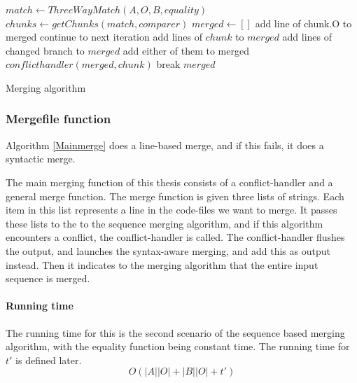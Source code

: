 \documentclass[11pt]{article}
\begin{document}
\begin{algorithm}
\begin{algorithmic}
   \State $match \gets ThreeWayMatch(A, O, B, equality)$
   \State $chunks \gets getChunks(match, comparer)$
   \State $merged \gets []$
            \State add line of chunk.O to merged
            \State continue to next iteration
        \EndIf
            \State add lines of $chunk$ to $merged$
        \Else
               \State add lines of changed branch to $merged$
            \Else
                   \State add either of them to merged
                \Else
                   \State $conflicthandler(merged, chunk)$
                      \State break
                   \EndIf
                \EndIf
			\EndIf
   		\EndIf
    \EndFor
	\State \Return $merged$
\EndFunction


\end{algorithmic}
\caption{Merging algorithm}
  \label{Genericmergingalgorithm}
\end{algorithm}

\subsubsection{Mergefile function}
Algorithm \ref{Mainmerge} does a line-based merge, and if this fails, it does a syntactic merge.

The main merging function of this thesis consists of a conflict-handler and a general merge function. The merge function is given three lists of strings. Each item in this list represents a line in the code-files we want to merge. It passes these lists to the to the sequence merging algorithm, and if this algorithm encounters a conflict, the conflict-handler is called. The conflict-handler flushes the output, and launches the syntax-aware merging, and add this as output instead. Then it indicates to the merging algorithm that the entire input sequence is merged.

\paragraph{Running time} The running time for this is the second scenario of the sequence based merging algorithm, with the equality function being constant time. The running time for $t'$ is defined later. 
		\begin{equation}
			O(|A||O| + |B||O| + t') \nonumber
		\end{equation}
\end{document}
